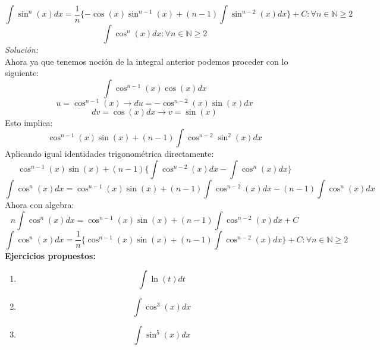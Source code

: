 \documentclass[10pt,executivepaper]{article}
\begin{document}
\[\int\sin^{n}(x)dx=\frac{1}{n}\{-\cos(x)\sin^{n-1}(x) + (n-1)\int \sin^{n-2}(x)dx\} + C \colon \forall n\in\mathbb{N}\geq 2\]
\vspace{1cm}
\[\int \cos^{n}(x)dx \colon \forall n\in\mathbb{N}\geq 2\]
\textit{Solución:}\\
Ahora ya que tenemos noción de la integral anterior podemos proceder con lo siguiente:
\[\int\cos^{n-1}(x)\cos(x)dx\]
\[u=\cos^{n-1}(x)\rightarrow du=-\cos^{n-2}(x)\sin(x)dx\]
\[dv=\cos(x)dx \rightarrow v=\sin(x)\]
Esto implica:
\[\cos^{n-1}(x)\sin(x)+(n-1)\int\cos^{n-2}\sin^{2}(x)dx\]
Aplicando igual identidades trigonométrica directamente:
\[\cos^{n-1}(x)\sin(x)+(n-1)\{\int\cos^{n-2}(x)dx - \int\cos^{n}(x)dx\}\]
\[\int\cos^{n}(x)dx =\cos^{n-1}(x)\sin(x)+(n-1)\int\cos^{n-2}(x)dx-(n-1)\int\cos^{n}(x)dx\ \]
Ahora con algebra:
\[n\int\cos^{n}(x)dx =\cos^{n-1}(x)\sin(x)+(n-1)\int\cos^{n-2}(x)dx+C\]
\[\int\cos^{n}(x)dx =\frac{1}{n}\{\cos^{n-1}(x)\sin(x)+(n-1)\int\cos^{n-2}(x)dx\}+C \colon \forall n\in\mathbb{N}\geq 2\]
\textbf{Ejercicios propuestos:}
\begin{enumerate}
  \item \[\int\ln(t)dt\]
  \item \[\int \cos^{3}(x)dx\]
  \item \[\int \sin^{5}(x)dx\]
\end{enumerate}
\clearpage
\end{document}
